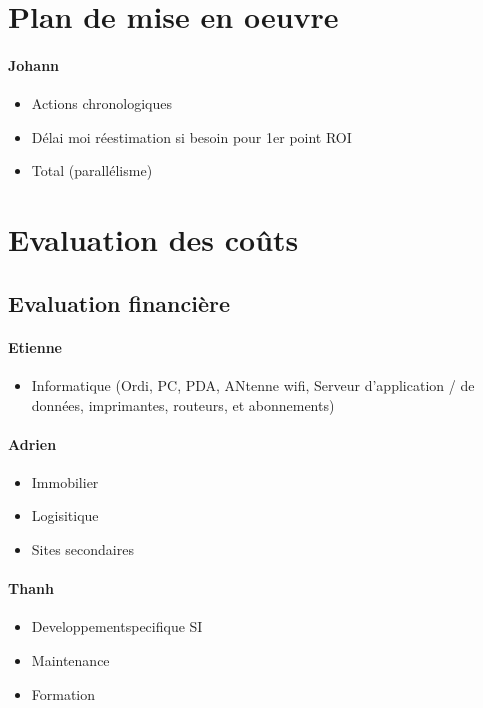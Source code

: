 \section{Plan de mise en oeuvre}
    \paragraph{Johann}
    \begin{itemize}
        \item Actions chronologiques
        \item Délai
            \subitem moi réestimation si besoin pour 1er point ROI
        \item Total (parallélisme)
    \end{itemize}

\section{Evaluation des coûts}

    \subsection{Evaluation financière}
        \paragraph{Etienne}
        \begin{itemize}
            \item Informatique (Ordi, PC, PDA, ANtenne wifi, Serveur d'application / de données, imprimantes, routeurs, et abonnements)
        \end{itemize}
        
        \paragraph{Adrien}
        \begin{itemize}
            \item Immobilier
            \item Logisitique
            \item Sites secondaires
        \end{itemize}
        
        \paragraph{Thanh}
        \begin{itemize}
            \item Developpementspecifique SI
            \item Maintenance
            \item Formation
        \end{itemize}

